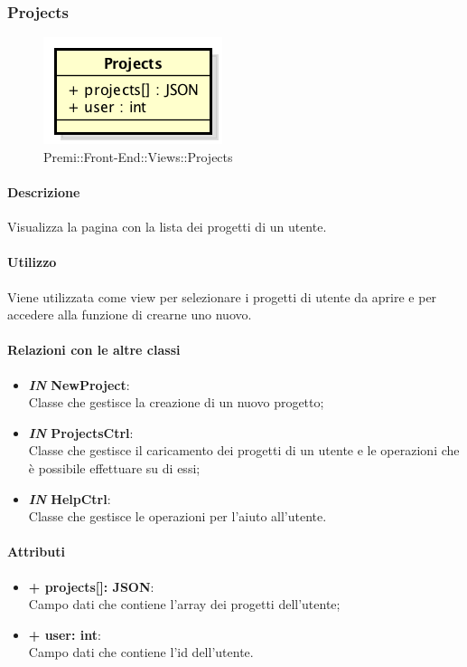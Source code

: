 	
\subsubsection{Projects}
	\begin{figure}[h]
		\centering
		\includegraphics[width=0.3\linewidth]{img/premi_front_end_views_projects}
		\caption[Premi::Front-End::Views::Projects]{Premi::Front-End::Views::Projects}
	\end{figure}
	
	\paragraph{Descrizione}
	Visualizza la pagina con la lista dei progetti di un utente.
	
	\paragraph{Utilizzo}
	Viene utilizzata come view per selezionare i progetti di utente da aprire e per accedere alla funzione di crearne uno nuovo.
	
	\paragraph{Relazioni con le altre classi}
	\begin{itemize}
		\item \textbf{\textit{IN} NewProject}:\\
			Classe che gestisce la creazione di un nuovo progetto;
		\item \textbf{\textit{IN} ProjectsCtrl}:\\
			Classe che gestisce il caricamento dei progetti di un utente e le operazioni che è possibile effettuare su di essi;
		\item \textbf{\textit{IN} HelpCtrl}:\\
		Classe che gestisce le operazioni per l'aiuto all'utente.
	\end{itemize}
	
	\paragraph{Attributi}
	\begin{itemize}
		\item \textbf{+ projects[]: JSON}:\\
			Campo dati che contiene l'array dei progetti dell'utente;
		\item \textbf{+ user: int}:\\
			Campo dati che contiene l'id dell'utente.
	\end{itemize}
\newpage
	
